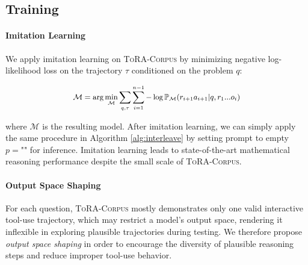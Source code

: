 \subsection{Training}

\paragraph{Imitation Learning}

We apply imitation learning on \textsc{ToRA-Corpus} by minimizing negative log-likelihood loss on the trajectory $\tau$ conditioned on the problem $q$:

\begin{equation}
    \small
    \begin{split}
        \mathcal{M} = \arg\min_{\mathcal{M}} \sum_{q, \tau} \sum_{i=1}^{n-1} - \log \mathbb{P}_{\mathcal{M}}(r_{i + 1} a_{i + 1}|q, r_1...o_i)
    \end{split}
\end{equation}

where $\mathcal{M}$ is the resulting model. After imitation learning, we can simply apply the same procedure in Algorithm \ref{alg:interleave} by setting prompt to empty $p=\text{""}$ for inference. Imitation learning leads to state-of-the-art mathematical reasoning performance despite the small scale of \textsc{ToRA-Corpus}.

\paragraph{Output Space Shaping}
\label{sec:method:shaping}
For each question, \textsc{ToRA-Corpus} mostly demonstrates only one valid interactive tool-use trajectory, which may restrict a model's output space, rendering it inflexible in exploring plausible trajectories during testing. We therefore propose \emph{output space shaping} in order to encourage the diversity of plausible reasoning steps and reduce improper tool-use behavior.

